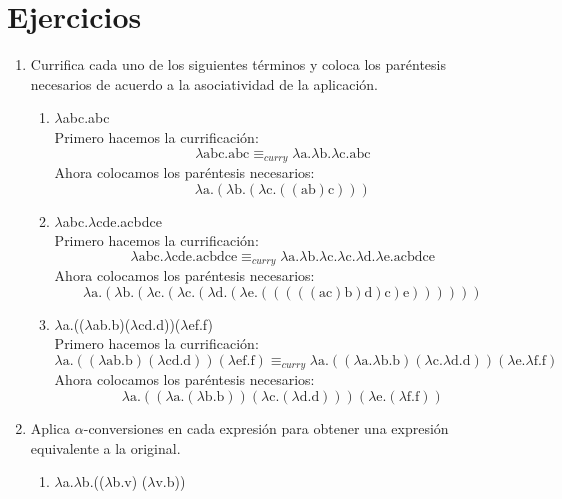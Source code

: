\documentclass[11pt]{article}
\begin{document}
\section*{Ejercicios}

\begin{enumerate}[leftmargin=0.8cm]
    \item Currifica cada uno de los siguientes términos y coloca los paréntesis necesarios de acuerdo a la asociatividad de la aplicación.
    \begin{enumerate}
        \item $\lambda$abc.abc\\
        Primero hacemos la currificación:
        \[
            \lambda\text{abc.abc} \equiv _{curry} \lambda \text{a.}\lambda \text{b.}\lambda \text{c.abc}
        \]
        Ahora colocamos los paréntesis necesarios:
        \[
            \lambda \text{a.}(\lambda \text{b.}(\lambda \text{c.}((\text{ab})\text{c})))
        \]
        \item $\lambda$abc.$\lambda$cde.acbdce\\
        Primero hacemos la currificación:
        \[
            \lambda\text{abc.}\lambda\text{cde.acbdce} \equiv _{curry} \lambda \text{a.}\lambda \text{b.}\lambda \text{c.}\lambda \text{c.}\lambda \text{d.}\lambda \text{e.acbdce}
        \]
        Ahora colocamos los paréntesis necesarios:
        \[
            \lambda \text{a.}(\lambda \text{b.}(\lambda \text{c.}(\lambda \text{c.}(\lambda \text{d.}(\lambda \text{e.}(((((\text{ac})\text{b})\text{d})\text{c})\text{e}))))))
        \]
        \item $\lambda$a.(($\lambda$ab.b)($\lambda$cd.d))($\lambda$ef.f)\\
        Primero hacemos la currificación:
        \[
            \lambda\text{a.}((\lambda\text{ab.b})(\lambda\text{cd.d}))(\lambda\text{ef.f}) \equiv _{curry} \lambda \text{a.}((\lambda \text{a.}\lambda \text{b.b})(\lambda \text{c.}\lambda \text{d.d}))(\lambda \text{e.}\lambda \text{f.f})
        \]
        Ahora colocamos los paréntesis necesarios:
        \[
            \lambda \text{a.}((\lambda \text{a.}(\lambda \text{b.b}))(\lambda \text{c.}(\lambda \text{d.d})))(\lambda \text{e.}(\lambda \text{f.f}))
        \]
    \end{enumerate}
    \item Aplica $\alpha$-conversiones en cada expresión para obtener una expresión equivalente a la original.
    \begin{enumerate}
        \item $\lambda$a.$\lambda$b.(($\lambda$b.v) ($\lambda$v.b))\\

\end{enumerate}
\end{enumerate}
\end{document}
